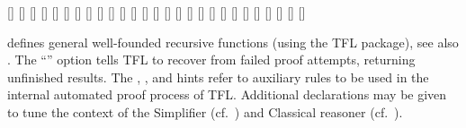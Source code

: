 \begin{isabellebody}
\begin{isamarkuptext}
  \begin{railoutput}
[]
\rail@bar
{}
[]
[]
[]
\rail@endbar
{}
[]
[]
\rail@plus
{}[]
\rail@endplus
\rail@bar
{}
[]
\rail@endbar
\rail@end
{}
[]
\rail@bar
{}
[]
\rail@endbar
{}[]
\rail@end
{}
[]
[]
\rail@plus
{}
[]
\rail@endplus
{}[]
\rail@end
{}
\rail@bar
\rail@bar
{}[]
[]
[]
\rail@endbar
\rail@bar
{}
[]
[]
\rail@endbar
{}[]
[]
[]
\rail@endbar
\rail@end
{}
[]
\rail@bar
{}
[]
[]
[]
\rail@endbar
\rail@end
\end{railoutput}


  \begin{description}

  \item \hyperlink{command.HOL.recdef}{\mbox{}} defines general well-founded
  recursive functions (using the TFL package), see also
  \cite{isabelle-HOL}.  The ``'' option tells
  TFL to recover from failed proof attempts, returning unfinished
  results.  The , , and  hints refer to auxiliary rules to be used in the internal
  automated proof process of TFL.  Additional \hyperlink{syntax.clasimpmod}{\mbox{}}
  declarations may be given to tune the context of the Simplifier
  (cf.\ ) and Classical reasoner (cf.\
  ).


\end{description}
\end{isamarkuptext}
\end{isabellebody}
